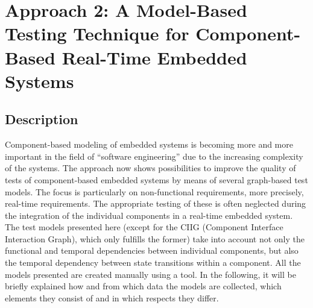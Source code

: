 \section{Approach 2: A Model-Based Testing Technique for Component-Based Real-Time
Embedded Systems\label{sec:Approach-2}}

\subsection{Description}

Component-based modeling of embedded systems is becoming more and
more important in the field of \enquote{software engineering}
due to the increasing complexity of the systems. The approach now
shows possibilities to improve the quality of tests of component-based
embedded systems by means of several graph-based test models. The
focus is particularly on non-functional requirements, more precisely,
real-time requirements. The appropriate testing of these is often
neglected during the integration of the individual components in a
real-time embedded system. The test models presented here (except
for the CIIG (Component Interface Interaction Graph), which only fulfills
the former) take into account not only the functional and temporal
dependencies between individual components, but also the temporal
dependency between state transitions within a component. All the models
presented are created manually using a tool. In the following, it
will be briefly explained how and from which data the models are collected,
which elements they consist of and in which respects they differ.

